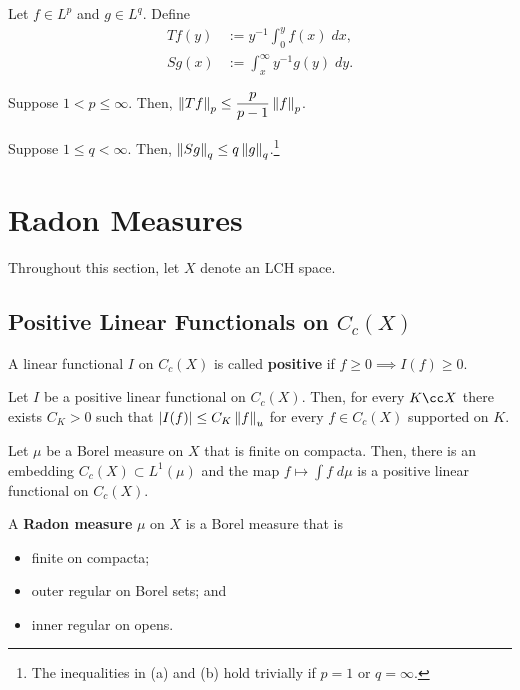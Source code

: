 \documentclass[11pt]{article}
\begin{document}
\begin{corollary}
Let $f\in L^p$ and $g\in L^q$. Define
\begin{align*}
Tf(y)&:=y^{-1}\int_0^yf(x)\;dx, \\
Sg(x)&:=\int_x^{\infty}y^{-1}g(y)\;dy.
\end{align*}
\begin{enum}{\alph}
\item Suppose $1<p\leq\infty$. Then, $\left\lVert Tf\right\rVert_p\leq\dfrac{p}{p-1}\left\lVert f\right\rVert_p$.
\item Suppose $1\leq q<\infty$. Then, $\left\lVert Sg\right\rVert_q\leq q\left\lVert g\right\rVert_q$.\footnote{The inequalities in \textup{(a)} and \textup{(b)} hold trivially if $p=1$ or $q=\infty$.}
\end{enum}
\end{corollary}

\section{Radon Measures}
Throughout this section, let $X$ denote an LCH space.

\subsection{Positive Linear Functionals on $C_c(X)$}
A linear functional $I$ on $C_c(X)$ is called \textbf{positive} if $f\geq0\implies I(f)\geq0$. 

\begin{proposition}
Let $I$ be a positive linear functional on $C_c(X)$. Then, for every $K\cc X$ there exists $C_K>0$ such that $|I(f)|\leq C_K\left\lVert f\right\rVert_u$ for every $f\in C_c(X)$ supported on $K$.
\end{proposition}

Let $\mu$ be a Borel measure on $X$ that is finite on compacta. Then, there is an embedding $C_c(X)\subset L^1(\mu)$ and the map $f\mapsto\int f\;d\mu$ is a positive linear functional on $C_c(X)$.

\begin{definition}
A \textbf{Radon measure} $\mu$ on $X$ is a Borel measure that is
\begin{itemize}
\item finite on compacta;
\item outer regular on Borel sets; and
\item inner regular on opens.
\end{itemize}
\end{definition}
\end{document}
